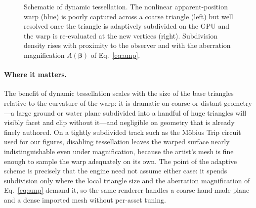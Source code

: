 \documentclass[aip,amsmath,amssymb,reprint,nofootinbib]{revtex4-2}
\begin{document}
\begin{figure}[t]
\centering
{}
\caption{Schematic of dynamic tessellation. The nonlinear apparent-position warp
(blue) is poorly captured across a coarse triangle (left) but well resolved once
the triangle is adaptively subdivided on the GPU and the warp is re-evaluated at
the new vertices (right). Subdivision density rises with proximity to the
observer and with the aberration magnification $A(\bm{\beta})$ of
Eq.~\eqref{eq:amp}.}
\label{fig:tess}
\end{figure}

\paragraph{Where it matters.}
The benefit of dynamic tessellation scales with the size of the base triangles
relative to the curvature of the warp: it is dramatic on coarse or distant
geometry---a large ground or water plane subdivided into a handful of huge
triangles will visibly facet and clip without it---and negligible on geometry
that is already finely authored. On a tightly subdivided track such as the
M\"obius Trip circuit used for our figures, disabling tessellation leaves the
warped surface nearly indistinguishable even under magnification, because the
artist's mesh is fine enough to sample the warp adequately on its own. The point
of the adaptive scheme is precisely that the engine need not assume either case:
it spends subdivision only where the local triangle size and the aberration
magnification of Eq.~\eqref{eq:amp} demand it, so the same renderer handles a
coarse hand-made plane and a dense imported mesh without per-asset tuning.
\end{document}
